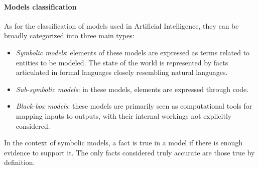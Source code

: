 \paragraph*{Models classification}
As for the classification of models used in Artificial Intelligence, they can be broadly categorized into three main types:
\begin{itemize}
    \item \textit{Symbolic models}: elements of these models are expressed as terms related to entities to be modeled. 
        The state of the world is represented by facts articulated in formal languages closely resembling natural languages.
    \item \textit{Sub-symbolic models}: in these models, elements are expressed through code.
    \item \textit{Black-box models}: these models are primarily seen as computational tools for mapping inputs to outputs, with their internal workings not explicitly considered.
\end{itemize}
In the context of symbolic models, a fact is true in a model if there is enough evidence to support it. 
The only facts considered truly accurate are those true by definition. 